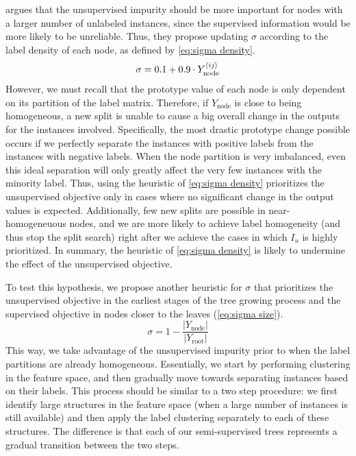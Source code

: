 
 argues that the unsupervised impurity should be more important for nodes with a larger number of unlabeled instances, since the supervised information would be more likely to be unreliable. Thus, they propose updating $\sigma$ according to the label density of each node, as defined by \autoref{eq:sigma density}.
%
\begin{equation}
    \sigma = 0.1 + 0.9 \cdot Y_\text{node}^{\langle ij \rangle}
    \label{eq:sigma density}
\end{equation}
%
However, we must recall that the prototype value of each node is only dependent on its partition of the label matrix. Therefore, if $Y_\text{node}$ is close to being homogeneous, a new split is unable to cause a big overall change in the outputs for the instances involved. Specifically, the most drastic prototype change possible occurs if we perfectly separate the instances with positive labels from the instances with negative labels.
When the node partition is very imbalanced, even this ideal separation will only greatly affect the very few instances with the minority label. Thus, using the heuristic of \autoref{eq:sigma density} prioritizes the unsupervised objective only in cases where no significant change in the output values is expected. Additionally, few new splits are possible in near-homogeneuous nodes, and we are more likely to achieve label homogeneity (and thus stop the split search) right after we achieve the cases in which $I_u$ is highly prioritized. In summary, the heuristic of \autoref{eq:sigma density} is likely to undermine the effect of the unsupervised objective.


To test this hypothesis, we propose another heuristic for $\sigma$ that prioritizes the unsupervised objective in the earliest stages of the tree growing process and the supervised objective in nodes closer to the leaves (\autoref{eq:sigma size}).
%
\begin{equation}
    \sigma = 1 - \frac{|Y_\text{node}|}{|Y_\text{root}|}
    \label{eq:sigma size}
\end{equation}
%
This way, we take advantage of the unsupervised impurity prior to when the label partitions are already homogeneous. Essentially, we start by performing clustering in the feature space, and then gradually move towards separating instances based on their labels.
This process should be similar to a two step procedure: we first identify large structures in the feature space (when a large number of instances is still available) and then apply the label clustering separately to each of these structures. The difference is that each of our semi-supervised trees represents a gradual transition between the two steps.

